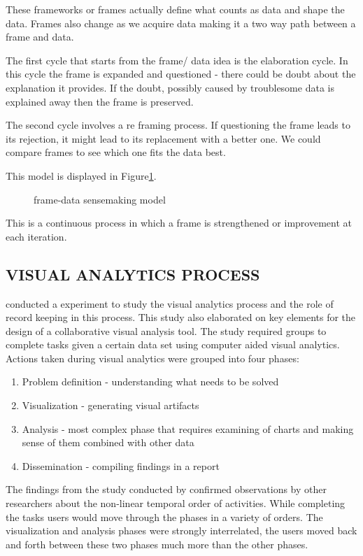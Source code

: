 These frameworks or frames actually define what counts as data and shape the data. Frames also change as we acquire data making it a two way path between a frame and data.

The first cycle that starts from the frame/ data idea is the elaboration cycle. In this cycle the frame is expanded and questioned - there could be doubt about the explanation it provides. If the doubt, possibly caused by troublesome data is explained away then the frame is preserved.

The second cycle involves a re framing process. If questioning the frame leads to its rejection, it might lead to its replacement with a better one. We could compare frames to see which one fits the data best.

This model is displayed in Figure\ref{fig:4}.
\begin{figure}[!ht]
	\centering{}
	\caption{\cite{klein2006making} frame-data sensemaking model}\label{fig:4}
\end{figure}

This is a continuous process in which a frame is strengthened or improvement at each iteration.

\subsection{VISUAL ANALYTICS PROCESS}

\cite{mahyar2010closer} conducted a experiment to study the visual analytics process and the role of record keeping in this process. This study also elaborated on key elements for the design of a collaborative visual analysis tool. The study required groups to complete tasks given a certain data set using computer aided visual analytics.
Actions taken during visual analytics were grouped into four phases:
\begin{enumerate}
	\item Problem definition - understanding what needs to be solved
	\item Visualization - generating visual artifacts
	\item Analysis - most complex phase that requires examining of charts and making sense of them combined with other data
	\item Dissemination - compiling findings in a report
\end{enumerate}
The findings from the study conducted by \cite{mahyar2010closer} confirmed observations by other researchers about the non-linear temporal order of activities. While completing the tasks users would move through the phases in a variety of orders. The visualization and analysis phases were strongly interrelated, the users moved back and forth between these two phases much more than the other phases.

